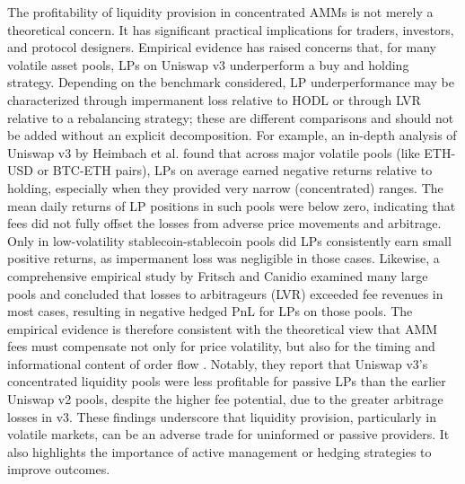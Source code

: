 \documentclass[11pt]{article}
\begin{document}
The profitability of liquidity provision in concentrated AMMs is not merely a theoretical concern. It has significant 
practical implications for traders, investors, and protocol designers. Empirical evidence has raised concerns that, for 
many volatile asset pools, LPs on Uniswap v3 underperform a buy and holding strategy. Depending on the benchmark considered, LP underperformance may be characterized through impermanent loss relative to HODL or through LVR relative to a rebalancing strategy; these are different comparisons and should not be added without an explicit decomposition. For example, an in-depth analysis of Uniswap v3 by Heimbach et 
al. \cite{heimbach2022} found that across major volatile pools (like ETH-USD or BTC-ETH pairs), LPs on average earned 
negative returns relative to holding, especially when they provided very narrow (concentrated) ranges. The mean daily 
returns of LP positions in such pools were below zero, indicating that fees did not fully offset the losses from adverse 
price movements and arbitrage. Only in low-volatility stablecoin-stablecoin pools did LPs consistently earn small 
positive returns, as impermanent loss was negligible in those cases. Likewise, a comprehensive empirical study by 
Fritsch and Canidio \cite{fritsch2024} examined many large pools and concluded that losses to arbitrageurs (LVR) 
exceeded fee revenues in most cases, resulting in negative hedged PnL for LPs on those pools. The empirical evidence is
therefore consistent with the theoretical view that AMM fees must compensate not only for price volatility, but also for the
timing and informational content of order flow \cite{milionis2023,fritsch2024,maire2024}. Notably, they report
that Uniswap v3’s concentrated liquidity pools were less profitable for passive LPs than the earlier Uniswap v2 
pools, despite the higher fee potential, due to the greater arbitrage losses in v3. These findings underscore that 
liquidity provision, particularly in volatile markets, can be an adverse trade for uninformed or passive providers. 
It also highlights the importance of active management or hedging strategies to improve outcomes.
\end{document}
